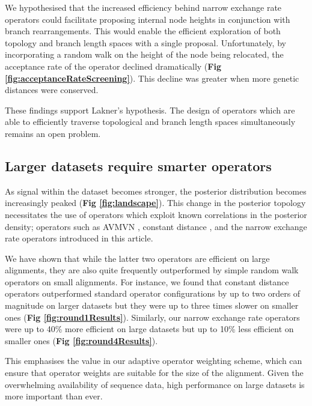 \documentclass[10pt,letterpaper]{article}
\begin{document}


We hypothesised that the increased efficiency behind narrow exchange rate operators could facilitate proposing internal node heights in conjunction with branch rearrangements.
This would enable the efficient exploration of both topology and branch length spaces with a single proposal.
Unfortunately, by incorporating a random walk on the height of the node being relocated, the acceptance rate of the operator declined dramatically  (\textbf{Fig \ref{fig:acceptanceRateScreening}}). 
This decline was greater when more genetic distances were conserved.


These findings support Lakner's hypothesis.
The design of operators which are able to efficiently traverse topological and branch length spaces simultaneously remains an open problem.

	
	
\subsection*{Larger datasets require smarter operators}

As signal within the dataset becomes stronger, the posterior distribution becomes increasingly peaked (\textbf{Fig \ref{fig:landscape}}).
This change in the posterior topology necessitates the use of operators which exploit known correlations in the posterior density; operators such as AVMVN \cite{baele2017adaptive}, constant distance \cite{zhang2020improving}, and the narrow exchange rate operators introduced in this article.

We have shown that while the latter two operators are efficient on large alignments, they are also quite frequently outperformed by simple random walk operators on small alignments.
For instance, we found that constant distance operators outperformed standard operator configurations by up to two orders of magnitude on larger datasets but they were up to three times slower on smaller ones (\textbf{Fig \ref{fig:round1Results}}). 
Similarly, our narrow exchange rate operators were up to 40\% more efficient on large datasets but up to 10\% less efficient on smaller ones (\textbf{Fig \ref{fig:round4Results}}).

This emphasises the value in our adaptive operator weighting scheme, which can ensure that operator weights are suitable for the size of the alignment.
Given the overwhelming availability of sequence data, high performance on large datasets is more important than ever.
\end{document}
